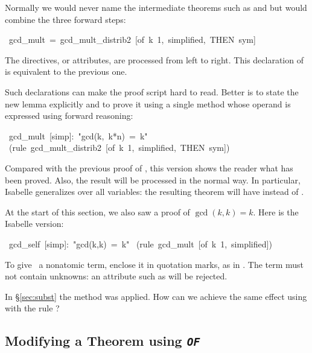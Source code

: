 %
Normally we would never name the intermediate theorems
such as  and  but would combine
the three forward steps: 
\begin{isabelle}
\ gcd_mult\ =\ gcd_mult_distrib2\ [of\ k\ 1,\ simplified,\ THEN\ sym]%
\end{isabelle}
The directives, or attributes, are processed from left to right.  This
declaration of  is equivalent to the
previous one.

Such declarations can make the proof script hard to read.  Better   
is to state the new lemma explicitly and to prove it using a single
 method whose operand is expressed using forward reasoning:
\begin{isabelle}
\ gcd_mult\
[simp]:\
"gcd(k,\ k*n)\ =\ k"\isanewline
{}\ (rule\ gcd_mult_distrib2\ [of\ k\ 1,\ simplified,\ THEN\ sym])
\end{isabelle}
Compared with the previous proof of \isa{gcd_mult}, this
version shows the reader what has been proved.  Also, the result will be processed
in the normal way.  In particular, Isabelle generalizes over all variables: the
resulting theorem will have {\isa{?k}} instead of {\isa{k}}.

At the start  of this section, we also saw a proof of $\gcd(k,k)=k$.  Here
is the Isabelle version:
\begin{isabelle}
\isacommand{lemma}\ gcd_self\ [simp]:\ "gcd(k,k)\ =\ k"\isanewline
\isacommand{by}\ (rule\ gcd_mult\ [of\ k\ 1,\ simplified])
\end{isabelle}

\begin{warn}
To give~ a nonatomic term, enclose it in quotation marks, as in
\isa{[of "k*m"]}.  The term must not contain unknowns: an
attribute such as 
\isa{[of "?k*m"]} will be rejected.
\end{warn}

\begin{exercise}
In {\S}\ref{sec:subst} the method  was applied.  How
can we achieve the same effect using  with the rule ?
\end{exercise}

\subsection{Modifying a Theorem using {\tt\slshape OF}}

